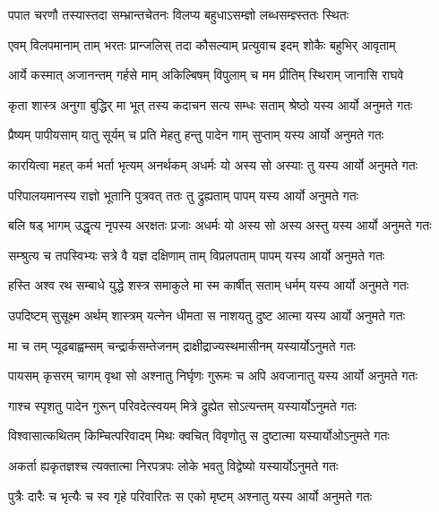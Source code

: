 \twolineshloka
{पपात चरणौ तस्यास्तदा सम्भ्रान्तचेतनः}
{विलप्य बहुधाऽसम्ज्ञो लब्धसम्ज्ञ्स्ततः स्थितः} %

\twolineshloka
{एवम् विलपमानाम् ताम् भरतः प्रान्जलिस् तदा}
{कौसल्याम् प्रत्युवाच इदम् शोकैः बहुभिर् आवृताम्} %

\twolineshloka
{आर्ये कस्मात् अजानन्तम् गर्हसे माम् अकिल्बिषम्}
{विपुलाम् च मम प्रीतिम् स्थिराम् जानासि राघवे} %

\twolineshloka
{कृता शास्त्र अनुगा बुद्धिर् मा भूत् तस्य कदाचन}
{सत्य सम्धः सताम् श्रेष्ठो यस्य आर्यो अनुमते गतः} %

\twolineshloka
{प्रैष्यम् पापीयसाम् यातु सूर्यम् च प्रति मेहतु}
{हन्तु पादेन गाम् सुप्ताम् यस्य आर्यो अनुमते गतः} %

\twolineshloka
{कारयित्वा महत् कर्म भर्ता भृत्यम् अनर्थकम्}
{अधर्मः यो अस्य सो अस्याः तु यस्य आर्यो अनुमते गतः} %

\twolineshloka
{परिपालयमानस्य राज्ञो भूतानि पुत्रवत्}
{ततः तु द्रुह्यताम् पापम् यस्य आर्यो अनुमते गतः} %

\twolineshloka
{बलि षड् भागम् उद्धृत्य नृपस्य अरक्षतः प्रजाः}
{अधर्मः यो अस्य सो अस्य अस्तु यस्य आर्यो अनुमते गतः} %

\twolineshloka
{सम्श्रुत्य च तपस्विभ्यः सत्रे वै यज्ञ दक्षिणाम्}
{ताम् विप्रलपताम् पापम् यस्य आर्यो अनुमते गतः} %

\twolineshloka
{हस्ति अश्व रथ सम्बाधे युद्धे शस्त्र समाकुले}
{मा स्म कार्षीत् सताम् धर्मम् यस्य आर्यो अनुमते गतः} %

\twolineshloka
{उपदिष्टम् सुसूक्ष्म अर्थम् शास्त्रम् यत्नेन धीमता}
{स नाशयतु दुष्ट आत्मा यस्य आर्यो अनुमते गतः} %

\twolineshloka
{मा च तम् प्यूढबाह्वम्सम् चन्द्रार्कसम्तेजनम्}
{द्राक्षीद्राज्यस्थमासीनम् यस्यार्योऽनुमते गतः} %

\twolineshloka
{पायसम् कृसरम् चागम् वृथा सो अश्नातु निर्घृणः}
{गुरूमः च अपि अवजानातु यस्य आर्यो अनुमते गतः} %

\twolineshloka
{गाश्च स्पृशतु पादेन गुरून् परिवदेत्स्वयम्}
{मित्रे द्रुह्येत सोऽत्यन्तम् यस्यार्योऽनुमते गतः} %

\twolineshloka
{विश्वासात्कथितम् किम्चित्परिवादम् मिथः क्वचित्}
{विवृणोतु स दुष्टात्मा यस्यार्योओऽनुमते गतः} %

\twolineshloka
{अकर्ता ह्यकृतज्ञश्च त्यक्तात्मा निरपत्रपः}
{लोके भवतु विद्वेष्यो यस्यार्योऽनुमते गतः} %

\twolineshloka
{पुत्रैः दारैः च भृत्यैः च स्व गृहे परिवारितः}
{स एको मृष्टम् अश्नातु यस्य आर्यो अनुमते गतः} %


